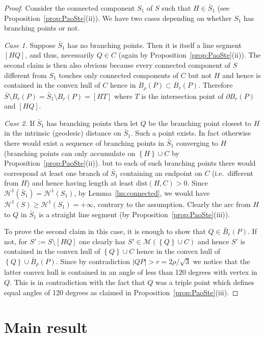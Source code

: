 \documentclass{amsart}
\renewcommand{\H}{\mathcal H}
\newcommand{\abs}[1]{\left\vert #1 \right\vert}
\newcommand{\ENCLOSE}[1]{\left\{#1\right\}}
\newcommand{\M}{\mathcal{M}}
\renewcommand{\H}{\mathcal{H}}
\newcommand{\dist}{\mathrm{dist}}
\theoremstyle{definition}
\theoremstyle{remark}
\begin{document}
\begin{proof}
  Consider the connected component $S_1$ of $S$ such that $H\in \bar S_1$
  (see Proposition~\ref{prop:PaoSte}(ii)).
  We have two cases depending on whether $S_1$ has branching points or not.
  
  \emph{Case 1.} Suppose $\bar S_1$ has no branching points. 
  Then it is itself a line 
  segment $[HQ]$, and thus, necessarily $Q\in C$ 
  (again by Proposition~\ref{prop:PaoSte}(ii)).
  The second claim is then also obvious because every connected component 
  of $S$ different from $S_1$ touches only connected components of $C$ 
  but not $H$
  and hence is contained in the convex hull of $C$ hence in $B_\rho(P)\subset B_r(P)$.
  Therefore $\bar S\setminus B_r(P) = \bar S_1\setminus B_r(P) = [HT]$
  where $T$ is the intersection point of $\partial B_r(P)$ and $[HQ]$.
  
  \emph{Case 2.} If $\bar S_1$ has branching points
  then let $Q$ be the branching point closest to $H$ 
  in the intrinsic (geodesic) distance on $\bar S_1$.
  Such a point exists. In fact otherwise there would exist a sequence of 
  branching points in $\bar S_1$ converging to $H$
  (branching points can only accumulate on $\ENCLOSE{H}\cup C$ 
  by Proposition~\ref{prop:PaoSte}(ii)).
  but to each of such branching points there would correspond at least 
  one branch of $\bar S_1$ containing an endpoint on $C$ 
  (i.e.\ different from $H$) and hence having length at least $\dist(H,C)>0$.
  Since $\H^1(\bar S_1)=\H^1(S_1)$, by Lemma~\ref{lm:connected}, 
  we would have $\H^1(S)\ge \H^1(S_1)= +\infty$, contrary to the assumption.
  Clearly the arc from $H$ to $Q$ in $\bar S_1$ is a straight line segment 
  (by Proposition~\ref{prop:PaoSte}(iii)).
  
  To prove the second claim in this case, 
  it is enough to show that $Q\in \bar B_r(P)$.
  If not, for $S':=S\setminus [HQ]$ one clearly has $S'\in \M(\ENCLOSE{Q} \cup C)$
  and hence $S'$ is contained in the convex hull of $\ENCLOSE{Q}\cup C$
  hence in the convex hull of $\ENCLOSE{Q}\cup \bar B_\rho(P)$.
  Since by contradiction $\abs{QP}> r = 2\rho/\sqrt 3$ 
  we notice that the latter convex 
  hull is contained in an angle of less than 120 degrees with vertex in $Q$.
  This is in contradiction with the fact that $Q$ was a triple point 
  which defines equal angles of 120 degrees as claimed in 
  Proposition~\ref{prop:PaoSte}(iii).
  \end{proof}
  
  \section{Main result}
\label{sec:main}
\end{document}
